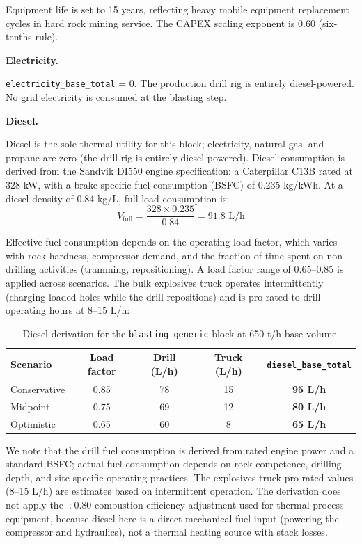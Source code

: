 Equipment life is set to 15 years, reflecting heavy mobile equipment replacement cycles in hard rock mining service. The CAPEX scaling exponent is 0.60 (six-tenths rule).

\medskip
\noindent\textbf{Electricity.}\quad

\texttt{electricity\_base\_total} = 0. The production drill rig is entirely diesel-powered. No grid electricity is consumed at the blasting step.

\medskip
\noindent\textbf{Diesel.}\quad

Diesel is the sole thermal utility for this block; electricity, natural gas, and propane are zero (the drill rig is entirely diesel-powered). Diesel consumption is derived from the Sandvik DI550 engine specification: a Caterpillar C13B rated at 328 kW, with a brake-specific fuel consumption (BSFC) of 0.235 kg/kWh. At a diesel density of 0.84 kg/L, full-load consumption is:
\[
	\dot{V}_{\text{full}} = \frac{328 \times 0.235}{0.84} = 91.8 \text{ L/h}
\]

Effective fuel consumption depends on the operating load factor, which varies with rock hardness, compressor demand, and the fraction of time spent on non-drilling activities (tramming, repositioning). A load factor range of 0.65--0.85 is applied across scenarios. The bulk explosives truck operates intermittently (charging loaded holes while the drill repositions) and is pro-rated to drill operating hours at 8--15 L/h:

\begin{table}[h!]
\caption{Diesel derivation for the \texttt{blasting\_generic} block at 650 t/h base volume.}
\centering
\begin{tabular}{lcccc}
\toprule
\textbf{Scenario} & \textbf{Load factor} & \textbf{Drill (L/h)} & \textbf{Truck (L/h)} & \texttt{diesel\_base\_total} \\
\midrule
Conservative & 0.85 & 78 & 15 & \textbf{95 L/h} \\
Midpoint     & 0.75 & 69 & 12 & \textbf{80 L/h} \\
Optimistic   & 0.65 & 60 &  8 & \textbf{65 L/h} \\
\bottomrule
\end{tabular}
\end{table}

We note that the drill fuel consumption is derived from rated engine power and a standard BSFC; actual fuel consumption depends on rock competence, drilling depth, and site-specific operating practices. The explosives truck pro-rated values (8--15 L/h) are estimates based on intermittent operation. The derivation does not apply the $\div 0.80$ combustion efficiency adjustment used for thermal process equipment, because diesel here is a direct mechanical fuel input (powering the compressor and hydraulics), not a thermal heating source with stack losses.

